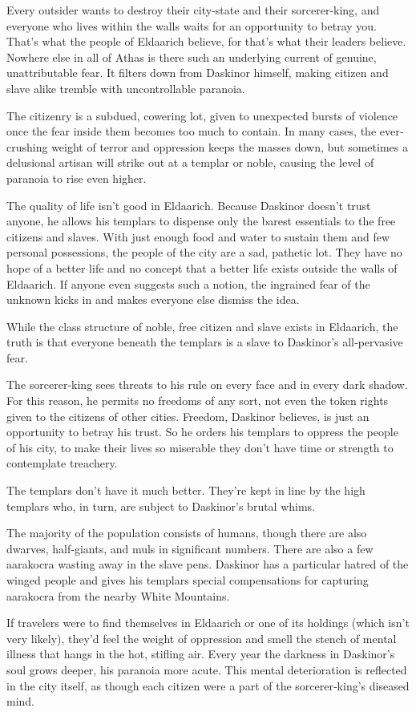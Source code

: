 {
	Every outsider wants to destroy their city‐state and their sorcerer‐king, and everyone who lives within the walls waits for an opportunity to betray you. That’s what the people of Eldaarich believe, for that’s what their leaders believe. Nowhere else in all of Athas is there such an underlying current of genuine, unattributable fear. It filters down from Daskinor himself, making citizen and slave alike tremble with uncontrollable paranoia.

	The citizenry is a subdued, cowering lot, given to unexpected bursts of violence once the fear inside them becomes too much to contain. In many cases, the ever‐crushing weight of terror and oppression keeps the masses down, but sometimes a delusional artisan will strike out at a templar or noble, causing the level of paranoia to rise even higher.

	The quality of life isn’t good in Eldaarich. Because Daskinor doesn’t trust anyone, he allows his templars to dispense only the barest essentials to the free citizens and slaves. With just enough food and water to sustain them and few personal possessions, the people of the city are a sad, pathetic lot. They have no hope of a better life and no concept that a better life exists outside the walls of Eldaarich. If anyone even suggests such a notion, the ingrained fear of the unknown kicks in and makes everyone else dismiss the idea.

	While the class structure of noble, free citizen and slave exists in Eldaarich, the truth is that everyone beneath the templars is a slave to Daskinor’s all‐pervasive fear.

	The sorcerer‐king sees threats to his rule on every face and in every dark shadow. For this reason, he permits no freedoms of any sort, not even the token rights given to the citizens of other cities. Freedom, Daskinor believes, is just an opportunity to betray his trust. So he orders his templars to oppress the people of his city, to make their lives so miserable they don’t have time or strength to contemplate treachery.

	The templars don’t have it much better. They’re kept in line by the high templars who, in turn, are subject to Daskinor’s brutal whims.

	The majority of the population consists of humans, though there are also dwarves, half‐giants, and muls in significant numbers. There are also a few aarakocra wasting away in the slave pens. Daskinor has a particular hatred of the winged people and gives his templars special compensations for capturing aarakocra from the nearby White Mountains.

	If travelers were to find themselves in Eldaarich or one of its holdings (which isn’t very likely), they’d feel the weight of oppression and smell the stench of mental illness that hangs in the hot, stifling air. Every year the darkness in Daskinor’s soul grows deeper, his paranoia more acute. This mental deterioration is reflected in the city itself, as though each citizen were a part of the sorcerer‐king’s diseased mind.
}
